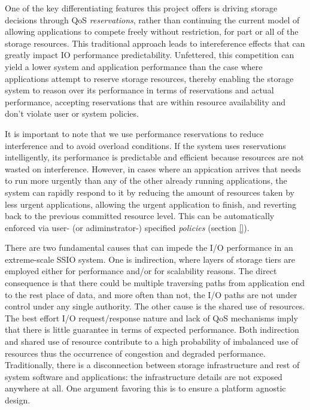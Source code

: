One of the key differentiating features this project offers is driving storage
decisions through QoS \emph{reservations}, rather than continuing the current model
of allowing applications to compete freely without restriction, for part or all of the storage
resources. This traditional approach leads to intereference effects
\cite{lofstead:2010:adaptive,liu_hotstorage} that can greatly impact IO performance predictability. 
Unfettered, this competition can yield a lower system and application performance 
than the case where applications attempt to reserve storage resources, thereby enabling the storage system
to reason over its performance in terms of reservations and actual
performance, accepting reservations that are within resource
availability and don't violate user or system policies.

It is important to note that we use performance reservations to
reduce interference and to avoid overload conditions. If the system
uses reservations intelligently, its performance is predictable and
efficient because resources are not wasted on interference. However,
in cases where an appication arrives that needs to run more urgently
than any of the other already running applications, the system
can rapidly respond to it by reducing the amount of resources taken 
by less urgent applications, allowing the urgent application to finish,
and reverting back to the previous committed resource level. This can
be automatically enforced via user- (or adiminstrator-) specified \textit{policies}
(section \ref{}).

There are two fundamental causes that can impede the I/O performance
in an extreme-scale SSIO system. One is indirection, where layers
of storage tiers are employed either for performance and/or for
scalability reasons.  The direct consequence is that there could
be multiple traversing paths from application end to the rest place
of data, and more often than not, the I/O paths are not under control
under any single authority. The other cause is the shared use of
resources. The best effort I/O request/response nature and lack of
QoS mechanisms imply that there is little guarantee in terms of
expected performance.  Both indirection and shared use of resource
contribute to a high probability of imbalanced use of resources
thus the occurrence of congestion and degraded performance.
Traditionally, there is a disconnection between storage infrastructure
and rest of system software and applications: the infrastructure
details are not exposed anywhere at all. One argument favoring this
is to ensure a platform agnostic design.

